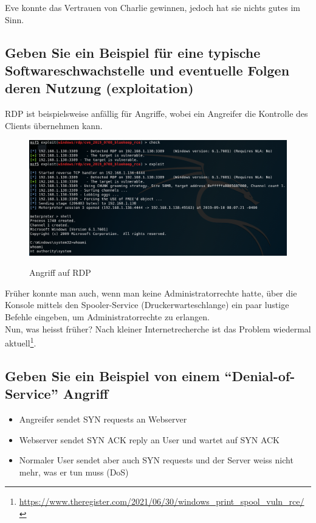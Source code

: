 Eve konnte das Vertrauen von Charlie gewinnen, jedoch hat sie nichts gutes im Sinn.

\subsection*{Geben Sie ein Beispiel für eine typische Softwareschwachstelle und eventuelle Folgen deren Nutzung (exploitation)}
RDP ist beispielsweise anfällig für Angriffe, wobei ein Angreifer die Kontrolle des Clients übernehmen kann.
\begin{figure}[H]
    \begin{center}
    \label{pic:RDPPenetration}
    \includegraphics[width=\textwidth]{images/targets-set.png}
    \caption[Angriff auf RDP]{Angriff auf RDP\footnotemark}
    \end{center}
\end{figure}

Früher konnte man auch, wenn man keine Administratorrechte hatte, über die Konsole mittels den Spooler-Service (Druckerwarteschlange) ein paar lustige Befehle eingeben, um Administratorrechte zu erlangen.\\
Nun, was heisst früher? Nach kleiner Internetrecherche ist das Problem wiedermal aktuell\footnote{\url{https://www.theregister.com/2021/06/30/windows_print_spool_vuln_rce/}}.

\subsection*{Geben Sie ein Beispiel von einem "`Denial-of-Service"' Angriff}
\begin{itemize}
    \item Angreifer sendet SYN requests an Webserver
    \item Webserver sendet SYN ACK reply an User und wartet auf SYN ACK
    \item Normaler User sendet aber auch SYN requests und der Server weiss nicht mehr, was er tun muss (DoS)
\end{itemize}

